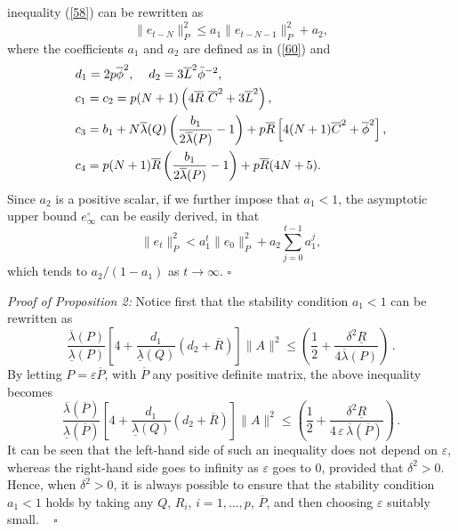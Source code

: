\documentclass[11pt,journal,onecolumn]{IEEEtran}
\begin{document}
inequality (\ref{58}) can be rewritten as
\begin{equation*}
\|e_{t-N}\|^{2}_{P}\leq a_{1}\|e_{t-N-1}\|^{2}_{P}+a_{2},
\end{equation*}
where the coefficients $a_{1}$ and $a_{2}$ are defined as in (\ref{60}) and
\begin{equation*}
\begin{split}
&d_{1}=2p\overline{\phi}^{2},\hspace{4mm}d_{2}=3\overline{L}^{2}\bar{\phi}^{-2}, \\
&c_{1}=c_{2}=p(N+1)\left(4\overline{R}~\overline{C}^{2}+3\overline{L}^{2}\right), \\
&c_{3}=b_{1}+N\overline{\lambda}(Q)\left(\frac{b_{1}}{2\overline{\lambda}(P)}-1\right)+p\overline{R}\left[4(N+1)\overline{C}^{2}+\overline{\phi}^{2}\right], \\
&c_{4}=p(N+1)\overline{R}\left(\frac{b_{1}}{2\overline{\lambda}(P)}-1\right)+p\overline{R}(4N+5).
\end{split}
\end{equation*}
Since $a_{2}$ is a positive scalar, if we further impose that $a_{1}<1$, the asymptotic upper bound $e^{\circ}_{\infty}$ can be easily derived, in that
\begin{equation*}\label{62}
\|e_{t}\|^{2}_{P}<a_{1}^{t}\|e_{0}\|^{2}_{P}+a_{2}\sum^{t-1}_{j=0}a_{1}^{j},
\end{equation*}
which tends to $a_{2}/(1-a_{1})$ as $t\rightarrow\infty$. \hfill \vspace{.1cm} $\square$
\vspace{.5cm}

{\em Proof of Proposition 2:}
Notice first that the stability condition $a_1 < 1$ can be rewritten as
\[
\frac{\overline{\lambda}(P)}{\underline{\lambda}(P)} \left[4+\frac{d_1}{\underline{\lambda}(Q)}\left(d_2+\overline{R} \right)\right] \| A \|^2
\le \left(\frac{1}{2}+\frac{\delta^{2}\underline{R}}{4\overline{\lambda}(P)}\right) \, .
\]
By letting $P = \varepsilon \overline{P}$, with $\overline{P}$ any positive definite matrix, the above inequality becomes
\[
\frac{\overline{\lambda}(\overline{P})}{\underline{\lambda}(\overline{P})} \left[4+\frac{d_1}{\underline{\lambda}(Q)}\left(d_2+\overline{R} \right)\right] \| A \|^2
\le \left(\frac{1}{2}+\frac{\delta^{2}\underline{R}}{4\, \varepsilon \, \overline{\lambda}(\overline{P})}\right) \, .
\]
It can be seen that the left-hand side of such an inequality does not depend on $\varepsilon$, whereas the right-hand side goes to infinity as $\varepsilon$ goes to $0$, provided that $\delta^2 >0$.
Hence, when $\delta^2 >0$, it is always possible to ensure that the stability condition $a_1 < 1$ holds by taking any $Q$, $R_i$, $i = 1, \ldots,p$, $\overline{P}$, and then choosing $\varepsilon$
suitably small.
\mbox{ } \hfill $\square$
\vspace{.1cm}
\end{document}
